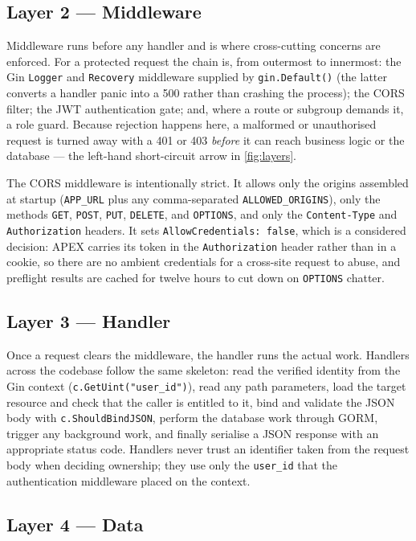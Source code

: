 \subsection{Layer 2 --- Middleware}

Middleware runs before any handler and is where cross-cutting concerns are
enforced. For a protected request the chain is, from outermost to innermost: the
Gin \texttt{Logger} and \texttt{Recovery} middleware supplied by
\texttt{gin.Default()} (the latter converts a handler panic into a 500 rather
than crashing the process); the CORS filter; the JWT authentication gate; and,
where a route or subgroup demands it, a role guard. Because rejection happens
here, a malformed or unauthorised request is turned away with a 401 or 403
\emph{before} it can reach business logic or the database --- the left-hand
short-circuit arrow in \cref{fig:layers}.

The CORS middleware is intentionally strict. It allows only the origins
assembled at startup (\texttt{APP\_URL} plus any comma-separated
\texttt{ALLOWED\_ORIGINS}), only the methods \texttt{GET}, \texttt{POST},
\texttt{PUT}, \texttt{DELETE}, and \texttt{OPTIONS}, and only the
\texttt{Content-Type} and \texttt{Authorization} headers. It sets
\texttt{AllowCredentials: false}, which is a considered decision: APEX carries
its token in the \texttt{Authorization} header rather than in a cookie, so there
are no ambient credentials for a cross-site request to abuse, and preflight
results are cached for twelve hours to cut down on \texttt{OPTIONS} chatter.

\subsection{Layer 3 --- Handler}

Once a request clears the middleware, the handler runs the actual work. Handlers
across the codebase follow the same skeleton: read the verified identity from
the Gin context (\texttt{c.GetUint("user\_id")}), read any path parameters, load
the target resource and check that the caller is entitled to it, bind and
validate the JSON body with \texttt{c.ShouldBindJSON}, perform the database work
through GORM, trigger any background work, and finally serialise a JSON response
with an appropriate status code. Handlers never trust an identifier taken from
the request body when deciding ownership; they use only the \texttt{user\_id}
that the authentication middleware placed on the context.

\subsection{Layer 4 --- Data}

